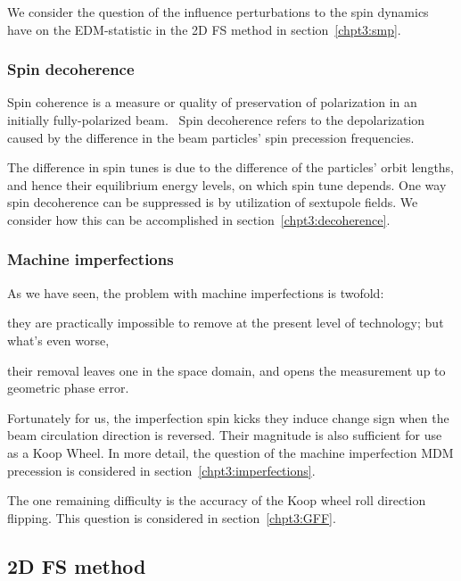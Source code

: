 We consider the question of the influence perturbations to the spin dynamics have on the EDM-statistic in the
2D FS method in section~\ref{chpt3:smp}.

\subsubsection{Spin decoherence}
Spin coherence is a measure or quality of preservation of polarization in an initially fully-polarized
beam.~\cite{Eremey:Thesis} Spin decoherence refers to the depolarization caused by the difference in the
beam particles' spin precession frequencies. 

The difference in spin tunes is due to the difference of the particles' orbit lengths, and hence their
equilibrium energy levels, on which spin tune depends. One way spin decoherence can be suppressed is by
utilization of sextupole fields. We consider how this can be accomplished in section~\ref{chpt3:decoherence}.

\subsubsection{Machine imperfections}
As we have seen, the problem with machine imperfections is twofold:
\begin{enumerate*}[(i)]
\item they are practically impossible to remove at the present level of technology; but what's even worse, 
\item their removal leaves one in the space domain, and opens the measurement up to geometric phase error.
\end{enumerate*}

Fortunately for us, the imperfection spin kicks they induce change sign when the beam circulation direction
is reversed. Their magnitude is also sufficient for use as a Koop Wheel.  In more detail, the question of the machine imperfection MDM precession is considered in section~\ref{chpt3:imperfections}.

The one remaining difficulty is the accuracy of the Koop wheel roll direction flipping.
This question is considered in section~\ref{chpt3:GFF}.

\subsection{2D FS method}\label{sec:FDM_concept}
